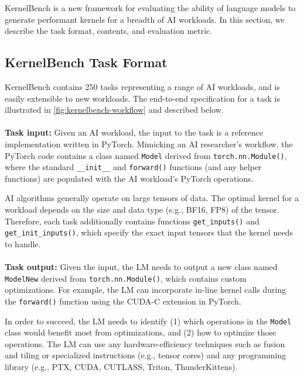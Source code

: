 KernelBench is a new framework for evaluating the ability of language models to generate performant kernels for a breadth of AI workloads.  In this section, we describe the task format, contents, and evaluation metric. 

\subsection{KernelBench Task Format}
KernelBench contains 250 tasks representing a range of AI workloads, and is easily extensible to new workloads. The end-to-end specification for a task is illustrated in \autoref{fig:kernelbench-workflow} and described below. 
\\\\
\noindent \textbf{Task input:} Given an AI workload, the input to the task is a reference implementation written in PyTorch. Mimicking an AI researcher's workflow, the PyTorch code contains a class named \texttt{Model} derived from \texttt{torch.nn.Module()}, where the standard \texttt{\_\_init\_\_} and \texttt{forward()} functions (and any helper functions) are populated with the AI workload's PyTorch operations. 

AI algorithms generally operate on large tensors of data. The optimal kernel for a workload depends on the size and data type (e.g., BF16, FP8) of the tensor. Therefore, each task additionally contains functions \texttt{get\_inputs()} and \texttt{get\_init\_inputs()}, which specify the exact input tensors that the kernel needs to handle.
\\\\
\noindent \textbf{Task output:} Given the input, the LM needs to output a new class named \texttt{ModelNew} derived from \texttt{torch.nn.Module()}, which contains custom optimizations. For example, the LM can incorporate in-line kernel calls during the \texttt{forward()} function using the CUDA-C extension in PyTorch.

In order to succeed, the LM needs to identify (1) which operations in the \texttt{Model} class would benefit most from optimizations, and (2) how to optimize those operations. The LM can use any hardware-efficiency techniques such as fusion and tiling or specialized instructions (e.g., tensor cores) and any programming library (e.g., PTX, CUDA, CUTLASS, Triton, ThunderKittens).



